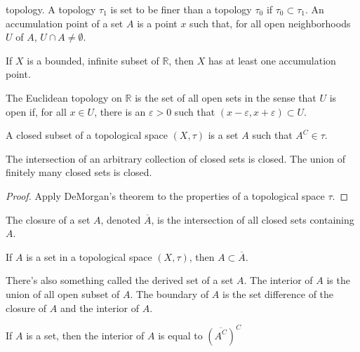 \documentclass[crop=false,class=book,oneside]{standalone}
\begin{document}
        topology. A topology $\tau_{1}$ is set to
        be finer than a topology $\tau_{0}$ if
        $\tau_{0}\subset\tau_{1}$. An accumulation point
        of a set $A$ is a point $x$ such that, for
        all open neighborhoods $U$ of $A$,
        $U\cap{A}\ne\emptyset$.
        \begin{theorem}
            If $X$ is a bounded, infinite subset of
            $\mathbb{R}$, then $X$ has at least
            one accumulation point.
        \end{theorem}
        \begin{definition}
            The Euclidean topology on
            $\mathbb{R}$ is the set of
            all open sets in the sense that
            $U$ is open if, for all $x\in{U}$,
            there is an $\varepsilon>0$ such
            that $(x-\varepsilon,x+\varepsilon)\subset{U}$.
        \end{definition}
        \begin{definition}
            A closed subset of a topological space
            $(X,\tau)$ is a set $A$ such that
            $A^{C}\in\tau$.
        \end{definition}
        \begin{theorem}
            The intersection of an arbitrary collection of
            closed sets is closed. The union of finitely
            many closed sets is closed.
        \end{theorem}
        \begin{proof}
            Apply DeMorgan's theorem to the properties
            of a topological space $\tau$.
        \end{proof}
        \begin{definition}
            The closure of a set $A$,
            denoted $\overline{A}$, is the
            intersection of all closed sets
            containing $A$.
        \end{definition}
        \begin{theorem}
            If $A$ is a set in a topological space
            $(X,\tau)$, then $A\subset\overline{A}$.
        \end{theorem}
        There's also something called the derived
        set of a set $A$. The interior of $A$
        is the union of all open subset of $A$.
        The boundary of $A$ is the set difference
        of the closure of $A$ and the interior of
        $A$.
        \begin{theorem}
            If $A$ is a set, then
            the interior of $A$ is equal to
            $(\overline{A^{C}})^{C}$
        \end{theorem}
\end{document}
